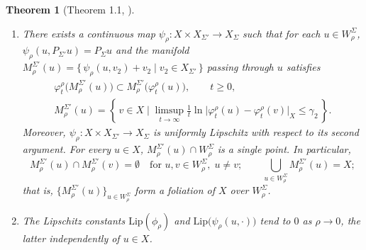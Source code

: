 \documentclass[a4paper, 12pt, oneside, reqno, notitlepage]{amsart}
\theoremstyle{plain}
\newtheorem{theorem}{Theorem}
\theoremstyle{definition}
\theoremstyle{remark}
\newcommand{\lip}{\mathrm{Lip}}
\begin{document}
\begin{theorem}[Theorem 1.1, \cite{chen1997invariant}]
\begin{enumerate}[label=\upshape{(\roman*)}]
  \item There exists a continuous map $\psi_\rho : X \times X_{\Sigma'} \to X_\Sigma$ such that for each $u \in W^{\Sigma}_\rho$, $\psi_\rho(u,P_{\Sigma'} u ) = P_{\Sigma} u$ and the manifold $M^{\Sigma'}_\rho(u) = \{ \, \psi_\rho(u,v_2)+v_2 \; | \; v_2 \in X_{\Sigma'} \, \}$ passing through $u$ satisfies
  \begin{subequations} \label{eq:foliationrho}
  \begin{gather}
      \varphi_t^\rho \big( M^{\Sigma'}_\rho(u) \big) \subset M^{\Sigma'}_\rho\big(\varphi_t^\rho(u)\big), \qquad t \geq 0, \label{eq:foliationinvariance} \\
      M^{\Sigma'}_\rho(u) = \left\{ \, v \in X \; \Big\vert \; \limsup_{t \to \infty} \frac1t \ln \vert \varphi_t^\rho(u) - \varphi_t^\rho (v) \vert_X \leq  \gamma_2 \,  \right\}.\label{eq:foliationdecay}
  \end{gather}
  \end{subequations}
  Moreover, $\psi_\rho : X \times X_{\Sigma'} \to X_\Sigma$ is uniformly Lipschitz  with respect to its second argument. 
  For every $u \in X$, $M^{\Sigma'}_\rho(u) \cap W^{\Sigma}_\rho$ is a single point. 
  In particular, 
  \begin{displaymath}
    M^{\Sigma'}_\rho(u) \cap M^{\Sigma'}_\rho(v) = \emptyset \quad \text{for } u,v \in W^{\Sigma}_\rho, \; u \neq v; \qquad \bigcup_{u \in W^{\Sigma}_\rho} M^{\Sigma'}_\rho(u) = X;
  \end{displaymath}
  that is, $\{ M^{\Sigma'}_\rho(u)  \}_{u \in W^{\Sigma}_\rho}$ form a foliation of $X$ over $W^{\Sigma}_\rho$.

  \item \label{extralipschitzstatement} The Lipschitz constants $\lip(\phi_\rho)$ and $\lip \big(\psi_\rho(u,\cdot) \big)$ tend to $0$ as $\rho \to 0$, the latter independently of $u \in X$. 
\end{enumerate}
\end{theorem}
\end{document}
